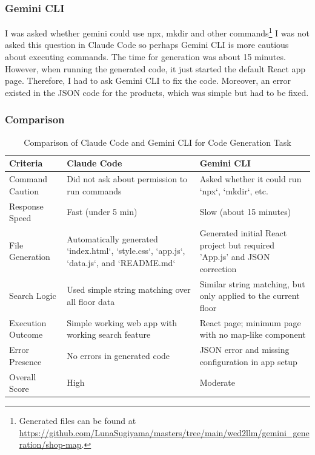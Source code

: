 \documentclass[9.5pt]{article}
\begin{document}
\subsubsection{Gemini CLI}
I was asked whether gemini could use npx, mkdir and other commands\footnote{Generated files can be found at \url{https://github.com/LunaSugiyama/masters/tree/main/wed2llm/gemini_generation/shop-map}.}
I was not asked this question in Claude Code so perhaps Gemini CLI is more cautious about executing commands.
The time for generation was about 15 minutes.
However, when running the generated code, it just started the default React app page.
Therefore, I had to ask Gemini CLI to fix the code.
Moreover, an error existed in the JSON code for the products, which was simple but had to be fixed.

\subsubsection{Comparison}
\begin{table}[h]
\centering
\caption{Comparison of Claude Code and Gemini CLI for Code Generation Task}
\label{tab:code_generation_comparison}
\renewcommand{\arraystretch}{1.2}
\begin{tabularx}{\textwidth}{|X|X|X|}
\hline
\textbf{Criteria} & \textbf{Claude Code} & \textbf{Gemini CLI} \\
\hline
Command Caution & Did not ask about permission to run commands & Asked whether it could run `npx`, `mkdir`, etc. \\
\hline
Response Speed & Fast (under 5 min) & Slow (about 15 minutes) \\
\hline
File Generation & Automatically generated `index.html`, `style.css`, `app.js`, `data.js`, and `README.md` & Generated initial React project but required 'App.js' and JSON correction \\
\hline
Search Logic & Used simple string matching over all floor data & Similar string matching, but only applied to the current floor \\
\hline
Execution Outcome & Simple working web app with working search feature & React page; minimum page with no map-like component \\
\hline
Error Presence & No errors in generated code & JSON error and missing configuration in app setup \\
\hline
Overall Score & High & Moderate \\
\hline
\end{tabularx}
\end{table}
\end{document}
